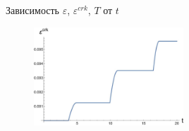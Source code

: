 \documentclass{beamer}
\begin{document}
	\begin{frame}{Зависимость $\varepsilon$, $\varepsilon^{crk}$, $T$ от $t$}
	\begin{figure}
		\begin{minipage}{0.45\textwidth}
		\end{minipage}
		\hfill
		\begin{minipage}{0.45\textwidth}
		\end{minipage}
		\label{ris:image1}
	\end{figure}
\begin{figure}
	\centering
	\includegraphics[width=0.5\textwidth]{T1_2}
\end{figure}
	\end{frame}
\end{document}
